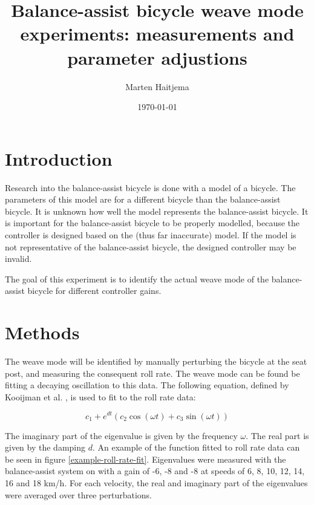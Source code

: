 \documentclass[12pt]{article}
\title{Balance-assist bicycle weave mode experiments: measurements and parameter adjustions}
\author{Marten Haitjema}
\date{\today}
\begin{document}
\maketitle

\section{Introduction}
Research into the balance-assist bicycle is done with a model of a bicycle. The parameters of this model are for a different bicycle than the balance-assist bicycle. It is unknown how well the model represents the balance-assist bicycle. It is important for the balance-assist bicycle to be properly modelled, because the controller is designed based on the (thus far inaccurate) model. If the model is not representative of the balance-assist bicycle, the designed controller may be invalid. 

The goal of this experiment is to identify the actual weave mode of the balance-assist bicycle for different controller gains. 

\section{Methods}
The weave mode will be identified by manually perturbing the bicycle at the seat post, and measuring the consequent roll rate. The weave mode can be found be fitting a decaying oscillation to this data. The following equation, defined by Kooijman et al. \cite{Kooijman2008}, is used to fit to the roll rate data:

\begin{equation}
    c_1 + e^{dt} (c_2\cos(\omega t) + c_3\sin(\omega t))
    \label{kooijman-func}
\end{equation}

The imaginary part of the eigenvalue is given by the frequency $\omega$. The real part is given by the damping $d$. An example of the function fitted to roll rate data can be seen in figure \ref{example-roll-rate-fit}. Eigenvalues were measured with the balance-assist system on with a gain of -6, -8 and -8 at speeds of 6, 8, 10, 12, 14, 16 and 18 km/h. For each velocity, the real and imaginary part of the eigenvalues were averaged over three perturbations.
\end{document}
